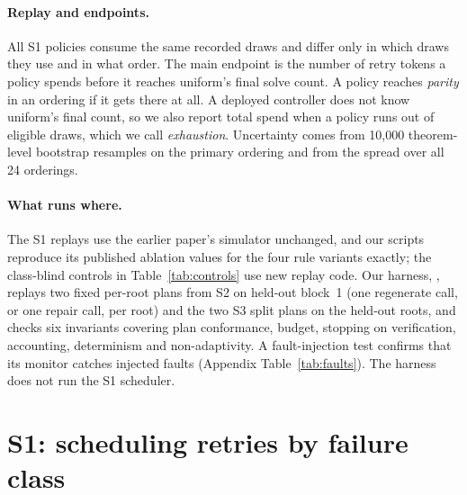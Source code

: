 \paragraph{Replay and endpoints.}
All S1 policies consume the same recorded draws and differ only in which draws they use and in what order.  The main endpoint is the number of retry tokens a policy spends before it reaches uniform's final solve count.  A policy reaches \emph{parity} in an ordering if it gets there at all.  A deployed controller does not know uniform's final count, so we also report total spend when a policy runs out of eligible draws, which we call \emph{exhaustion}.  Uncertainty comes from 10,000 theorem-level bootstrap resamples on the primary ordering and from the spread over all 24 orderings.

\paragraph{What runs where.}
The S1 replays use the earlier paper's simulator unchanged, and our scripts reproduce its published ablation values for the four rule variants exactly; the class-blind controls in Table~\ref{tab:controls} use new replay code.  Our harness, , replays two fixed per-root plans from S2 on held-out block~1 (one regenerate call, or one repair call, per root) and the two S3 split plans on the held-out roots, and checks six invariants covering plan conformance, budget, stopping on verification, accounting, determinism and non-adaptivity.  A fault-injection test confirms that its monitor catches \HarnessDetected{} injected faults (Appendix Table~\ref{tab:faults}).  The harness does not run the S1 scheduler.

\section{S1: scheduling retries by failure class}
\label{sec:scheduler}

